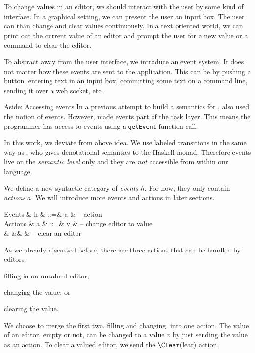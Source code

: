 To change values in an editor,
we should interact with the user by some kind of interface.
In a graphical setting,
we can present the user an input box.
The user can than change and clear values continuously.
In a text oriented world,
we can print out the current value of an editor
and prompt the user for a new value
or a command to clear the editor.

To abstract away from the user interface,
we introduce an event system.
It does not matter how these events are sent to the application.
This can be by pushing a button,
entering text in an input box,
committing some text on a command line,
sending it over a web socket,
etc.

\begin{margintext}{Aside: Accessing events}
In a previous attempt to build a semantics for \TOP,
\textcite{theses/radboud/VinterHviid18} also used the notion of events.
However, \citeauthor{theses/radboud/VinterHviid18} made events part of the task layer.
This means the programmer has access to events using a \texttt{getEvent} function call.

In this work,
we deviate from above idea.
We use labeled transitions in the same way as \textcite{school/maktoberdorf/PeytonJones01},
who gives denotational semantics to the Haskell \IO monad.
Therefore events live on the \emph{semantic level} only
and they are \emph{not} accessible from within our language.
\end{margintext}

We define a new syntactic category of \emph{events} $h$.
For now, they only contain \emph{actions} $a$.
We will introduce more events and actions in later sections.
\begin{grammar}
  Events
    & h & ::=& a      & – action \\
  Actions
    & a & ::=& v      & – change editor to value \\
    &   &\mid& \Clear & – clear an editor \\
\end{grammar}

As we already discussed before,
there are three actions that can be handled by editors:
\begin{enumerate*}
  \item filling in an unvalued editor;
  \item changing the value; or
  \item clearing the value.
\end{enumerate*}
We choose to merge the first two, filling and changing, into one action.
The value of an editor, empty or not, can be changed to a value $v$ by just sending the value as an action.
To clear a valued editor, we send the $\Clear$(lear) action.

